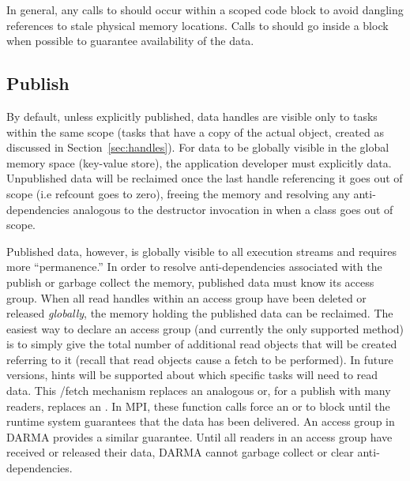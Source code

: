 In general, any calls to  should occur 
within a scoped code block to avoid dangling references to stale physical memory locations.
Calls to  should go inside a  block when possible 
to guarantee availability of the data.

\subsection{Publish}
\label{subsec:publish}
By default, unless explicitly published, data \glspl{handle} are visible only
to \glspl{task} within the same scope (\glspl{task} that have a copy of the actual
\ahandleT object, created as discussed in Section~\ref{sec:handles}).
For data to be globally visible in the global memory space (\gls{key-value store}),
the application developer must explicitly  data.  
Unpublished data will be reclaimed once the last \gls{handle} referencing it goes out of scope (i.e refcount goes to zero),
freeing the memory and resolving any anti-dependencies analogous to the
destructor invocation in \CC{} when a class goes out of scope.  

Published data, however, is globally visible to all \glspl{execution stream} and requires more ``permanence.''  
In order to resolve anti-dependencies associated with the publish or garbage collect the memory,
published data must know its \gls{access group}.
When all read \glspl{handle} within an \gls{access group} have been deleted or
released \emph{globally}, the memory holding the published data can be reclaimed.
The easiest way to declare an \gls{access group} (and currently the only supported method) is
to simply give the total number of additional read \ahandleT objects that will
be created referring to it (recall that read \ahandleT objects cause a
\gls{fetch} to be performed).
In future versions, hints will be supported about which specific \glspl{task} will need to read data.
This /\gls{fetch} mechanism replaces an analogous
 or, for a publish with many readers, replaces an .
In MPI, these function calls force an  or
 to block until the \gls{runtime system} guarantees that the data has been delivered.
An \gls{access group} in \gls{DARMA} provides a similar guarantee.
Until all readers in an \gls{access group} have received or released their
data, \gls{DARMA} cannot garbage collect or clear anti-dependencies.

